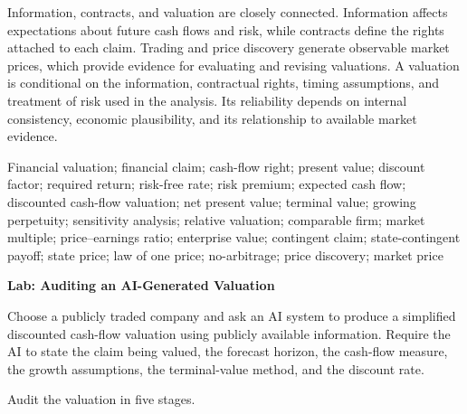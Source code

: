 Information, contracts, and valuation are closely connected. Information affects expectations about future cash flows and risk, while contracts define the rights attached to each claim. Trading and price discovery generate observable market prices, which provide evidence for evaluating and revising valuations. A valuation is conditional on the information, contractual rights, timing assumptions, and treatment of risk used in the analysis. Its reliability depends on internal consistency, economic plausibility, and its relationship to available market evidence.



Financial valuation; financial claim; cash-flow right; present value; discount factor; required return; risk-free rate; risk premium; expected cash flow; discounted cash-flow valuation; net present value; terminal value; growing perpetuity; sensitivity analysis; relative valuation; comparable firm; market multiple; price--earnings ratio; enterprise value; contingent claim; state-contingent payoff; state price; law of one price; no-arbitrage; price discovery; market price



\textbf{Lab: Auditing an AI-Generated Valuation}

Choose a publicly traded company and ask an AI system to produce a simplified discounted cash-flow valuation using publicly available information. Require the AI to state the claim being valued, the forecast horizon, the cash-flow measure, the growth assumptions, the terminal-value method, and the discount rate.

Audit the valuation in five stages.

